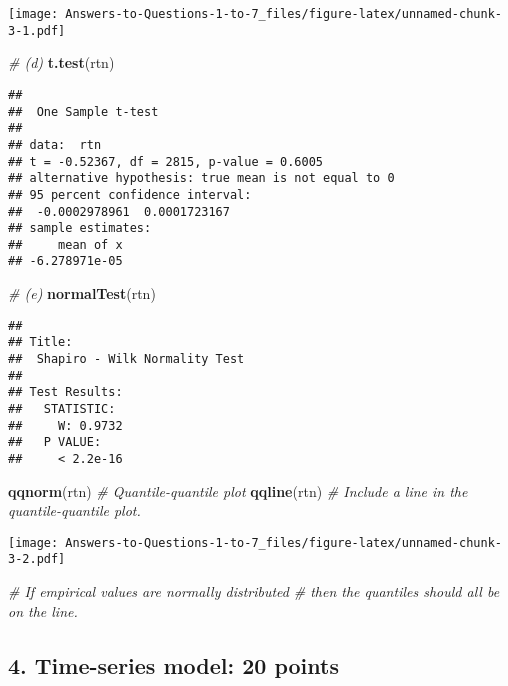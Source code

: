 \documentclass[
]{article}
\newenvironment{Shaded}{\begin{snugshade}}{\end{snugshade}}
\newcommand{\CommentTok}[1]{\textcolor[rgb]{0.56,0.35,0.01}{\textit{#1}}}
\newcommand{\FunctionTok}[1]{\textcolor[rgb]{0.13,0.29,0.53}{\textbf{#1}}}
\newcommand{\NormalTok}[1]{#1}
\begin{document}
\texttt{[image: Answers-to-Questions-1-to-7\_files/figure-latex/unnamed-chunk-3-1.pdf]}

\begin{Shaded}
\begin{Highlighting}[]
\CommentTok{\# (d)}
\FunctionTok{t.test}\NormalTok{(rtn)}
\end{Highlighting}
\end{Shaded}

\begin{verbatim}
## 
##  One Sample t-test
## 
## data:  rtn
## t = -0.52367, df = 2815, p-value = 0.6005
## alternative hypothesis: true mean is not equal to 0
## 95 percent confidence interval:
##  -0.0002978961  0.0001723167
## sample estimates:
##     mean of x 
## -6.278971e-05
\end{verbatim}

\begin{Shaded}
\begin{Highlighting}[]
\CommentTok{\# (e)}
\FunctionTok{normalTest}\NormalTok{(rtn)}
\end{Highlighting}
\end{Shaded}

\begin{verbatim}
## 
## Title:
##  Shapiro - Wilk Normality Test
## 
## Test Results:
##   STATISTIC:
##     W: 0.9732
##   P VALUE:
##     < 2.2e-16
\end{verbatim}

\begin{Shaded}
\begin{Highlighting}[]
\FunctionTok{qqnorm}\NormalTok{(rtn) }\CommentTok{\# Quantile{-}quantile plot}
\FunctionTok{qqline}\NormalTok{(rtn) }\CommentTok{\# Include a line in the quantile{-}quantile plot.}
\end{Highlighting}
\end{Shaded}

\texttt{[image: Answers-to-Questions-1-to-7\_files/figure-latex/unnamed-chunk-3-2.pdf]}

\begin{Shaded}
\begin{Highlighting}[]
\CommentTok{\# If empirical values are normally distributed}
\CommentTok{\# then the quantiles should all be on the line.}
\end{Highlighting}
\end{Shaded}

\subsection{4. Time-series model: 20
points}\label{time-series-model-20-points}
\end{document}

